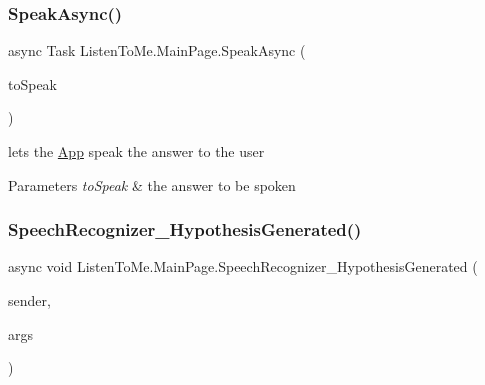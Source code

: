 \mbox{\label{class_listen_to_me_1_1_main_page_aa1c50f04230b8907027a95bfe54cb7d2}} 
\subsubsection{\texorpdfstring{Speak\+Async()}{SpeakAsync()}}
{\footnotesize\ttfamily async Task Listen\+To\+Me.\+Main\+Page.\+Speak\+Async (\begin{DoxyParamCaption}\item[{string}]{to\+Speak }\end{DoxyParamCaption})\hspace{0.3cm}{\ttfamily [private]}}



lets the \mbox{\hyperlink{class_listen_to_me_1_1_app}{App}} speak the answer to the user 


\begin{DoxyParams}{Parameters}
{\em to\+Speak} & the answer to be spoken\\
\hline
\end{DoxyParams}
\mbox{\label{class_listen_to_me_1_1_main_page_a78024cb9b68bafc3375081574dbbea89}} 
\subsubsection{\texorpdfstring{Speech\+Recognizer\+\_\+\+Hypothesis\+Generated()}{SpeechRecognizer\_HypothesisGenerated()}}
{\footnotesize\ttfamily async void Listen\+To\+Me.\+Main\+Page.\+Speech\+Recognizer\+\_\+\+Hypothesis\+Generated (\begin{DoxyParamCaption}\item[{Speech\+Recognizer}]{sender,  }\item[{Speech\+Recognition\+Hypothesis\+Generated\+Event\+Args}]{args }\end{DoxyParamCaption})\hspace{0.3cm}{\ttfamily [private]}}



